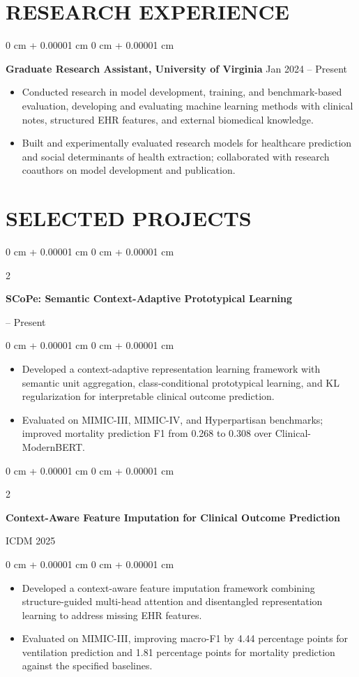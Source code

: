 \documentclass[10pt, letterpaper]{article}
\newenvironment{highlights}{
    \begin{itemize}[
        topsep=0.03 cm,
        parsep=0.03 cm,
        partopsep=0pt,
        itemsep=0pt,
        leftmargin=0 cm + 10pt
    ]
}{
    \end{itemize}
} %
\newenvironment{onecolentry}{
    \begin{adjustwidth}{
        0 cm + 0.00001 cm
    }{
        0 cm + 0.00001 cm
    }
}{
    \end{adjustwidth}
} %
\newenvironment{twocolentry}[2][]{
    \onecolentry
    \def\secondColumn{#2}
    \setcolumnwidth{\fill, 4.5 cm}
    \begin{paracol}{2}
}{
    \switchcolumn \raggedleft \secondColumn
    \end{paracol}
    \endonecolentry
} %
\begin{document}
\section{RESEARCH EXPERIENCE}
\begin{onecolentry}
\textbf{Graduate Research Assistant, University of Virginia} \hfill Jan 2024 -- Present
\begin{highlights}
\item Conducted research in model development, training, and benchmark-based evaluation, developing and evaluating machine learning methods with clinical notes, structured EHR features, and external biomedical knowledge.
\item Built and experimentally evaluated research models for healthcare prediction and social determinants of health extraction; collaborated with research coauthors on model development and publication.
\end{highlights}
\end{onecolentry}
\section{SELECTED PROJECTS}

\begin{twocolentry}{2026 -- Present}
\textbf{SCoPe: Semantic Context-Adaptive Prototypical Learning}
\end{twocolentry}
\begin{onecolentry}
\begin{highlights}
\item Developed a context-adaptive representation learning framework with semantic unit aggregation, class-conditional prototypical learning, and KL regularization for interpretable clinical outcome prediction.
\item Evaluated on MIMIC-III, MIMIC-IV, and Hyperpartisan benchmarks; improved mortality prediction F1 from 0.268 to 0.308 over Clinical-ModernBERT.
\end{highlights}
\end{onecolentry}
\vspace{0.06 cm}

\begin{twocolentry}{ICDM 2025}
\textbf{Context-Aware Feature Imputation for Clinical Outcome Prediction}
\end{twocolentry}
\begin{onecolentry}
\begin{highlights}
\item Developed a context-aware feature imputation framework combining structure-guided multi-head attention and disentangled representation learning to address missing EHR features.
\item Evaluated on MIMIC-III, improving macro-F1 by 4.44 percentage points for ventilation prediction and 1.81 percentage points for mortality prediction against the specified baselines.
\end{highlights}
\end{onecolentry}
\vspace{0.06 cm}
\end{document}
